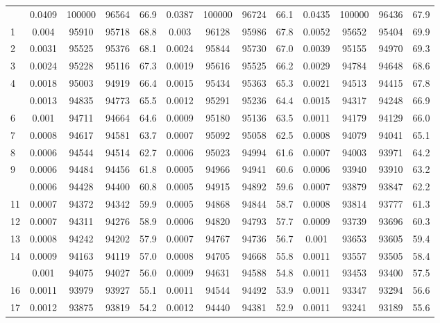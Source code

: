 \documentclass[
  14pt,
]{article}
\begin{document}
\begin{longtable}[t]{lcccccccccccc}
\endfoot
\bottomrule
\endlastfoot
0 & 0.0409 & 100000 & 96564 & 66.9 & 0.0387 & 100000 & 96724 & 66.1 & 0.0435 & 100000 & 96436 & 67.9\\
1 & 0.004 & 95910 & 95718 & 68.8 & 0.003 & 96128 & 95986 & 67.8 & 0.0052 & 95652 & 95404 & 69.9\\
2 & 0.0031 & 95525 & 95376 & 68.1 & 0.0024 & 95844 & 95730 & 67.0 & 0.0039 & 95155 & 94970 & 69.3\\
3 & 0.0024 & 95228 & 95116 & 67.3 & 0.0019 & 95616 & 95525 & 66.2 & 0.0029 & 94784 & 94648 & 68.6\\
4 & 0.0018 & 95003 & 94919 & 66.4 & 0.0015 & 95434 & 95363 & 65.3 & 0.0021 & 94513 & 94415 & 67.8\\
\addlinespace
5 & 0.0013 & 94835 & 94773 & 65.5 & 0.0012 & 95291 & 95236 & 64.4 & 0.0015 & 94317 & 94248 & 66.9\\
6 & 0.001 & 94711 & 94664 & 64.6 & 0.0009 & 95180 & 95136 & 63.5 & 0.0011 & 94179 & 94129 & 66.0\\
7 & 0.0008 & 94617 & 94581 & 63.7 & 0.0007 & 95092 & 95058 & 62.5 & 0.0008 & 94079 & 94041 & 65.1\\
8 & 0.0006 & 94544 & 94514 & 62.7 & 0.0006 & 95023 & 94994 & 61.6 & 0.0007 & 94003 & 93971 & 64.2\\
9 & 0.0006 & 94484 & 94456 & 61.8 & 0.0005 & 94966 & 94941 & 60.6 & 0.0006 & 93940 & 93910 & 63.2\\
\addlinespace
10 & 0.0006 & 94428 & 94400 & 60.8 & 0.0005 & 94915 & 94892 & 59.6 & 0.0007 & 93879 & 93847 & 62.2\\
11 & 0.0007 & 94372 & 94342 & 59.9 & 0.0005 & 94868 & 94844 & 58.7 & 0.0008 & 93814 & 93777 & 61.3\\
12 & 0.0007 & 94311 & 94276 & 58.9 & 0.0006 & 94820 & 94793 & 57.7 & 0.0009 & 93739 & 93696 & 60.3\\
13 & 0.0008 & 94242 & 94202 & 57.9 & 0.0007 & 94767 & 94736 & 56.7 & 0.001 & 93653 & 93605 & 59.4\\
14 & 0.0009 & 94163 & 94119 & 57.0 & 0.0008 & 94705 & 94668 & 55.8 & 0.0011 & 93557 & 93505 & 58.4\\
\addlinespace
15 & 0.001 & 94075 & 94027 & 56.0 & 0.0009 & 94631 & 94588 & 54.8 & 0.0011 & 93453 & 93400 & 57.5\\
16 & 0.0011 & 93979 & 93927 & 55.1 & 0.0011 & 94544 & 94492 & 53.9 & 0.0011 & 93347 & 93294 & 56.6\\
17 & 0.0012 & 93875 & 93819 & 54.2 & 0.0012 & 94440 & 94381 & 52.9 & 0.0011 & 93241 & 93189 & 55.6\\

\end{longtable}
\end{document}
